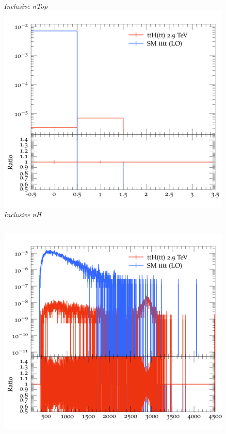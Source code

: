 \documentclass{beamer}
\begin{document}
\begin{frame}
\begin{columns}
\textit{\small Inclusive nTop}
\includegraphics[width=\textwidth]{../plots/ttH_2900/tttt_ttH/Inclusive_nH.png}\\
\textit{\small Inclusive nH}
\end{columns}
\begin{columns}
\includegraphics[width=\textwidth]{../plots/ttH_2900/tttt_ttH/Inclusive_InvM_ttbar12.png}\\

\end{columns}
\end{frame}
\end{document}
